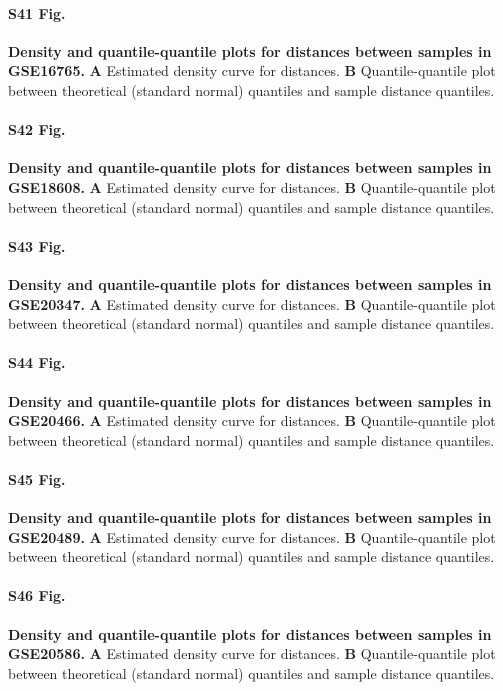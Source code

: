\documentclass[10pt,letterpaper]{article}
\begin{document}
\paragraph*{S41 Fig.}
\hypertarget{S41_Fig}{
{\bf Density and quantile-quantile plots for distances between samples in GSE16765.} \textbf{A} Estimated density curve for distances. \textbf{B} Quantile-quantile plot between theoretical (standard normal) quantiles and sample distance quantiles.}

\paragraph*{S42 Fig.}
\hypertarget{S42_Fig}{
{\bf Density and quantile-quantile plots for distances between samples in GSE18608.} \textbf{A} Estimated density curve for distances. \textbf{B} Quantile-quantile plot between theoretical (standard normal) quantiles and sample distance quantiles.}

\paragraph*{S43 Fig.}
\hypertarget{S43_Fig}{
{\bf Density and quantile-quantile plots for distances between samples in GSE20347.} \textbf{A} Estimated density curve for distances. \textbf{B} Quantile-quantile plot between theoretical (standard normal) quantiles and sample distance quantiles.}

\paragraph*{S44 Fig.}
\hypertarget{S44_Fig}{
{\bf Density and quantile-quantile plots for distances between samples in GSE20466.} \textbf{A} Estimated density curve for distances. \textbf{B} Quantile-quantile plot between theoretical (standard normal) quantiles and sample distance quantiles.}

\paragraph*{S45 Fig.}
\hypertarget{S45_Fig}{
{\bf Density and quantile-quantile plots for distances between samples in GSE20489.} \textbf{A} Estimated density curve for distances. \textbf{B} Quantile-quantile plot between theoretical (standard normal) quantiles and sample distance quantiles.}

\paragraph*{S46 Fig.}
\hypertarget{S46_Fig}{
{\bf Density and quantile-quantile plots for distances between samples in GSE20586.} \textbf{A} Estimated density curve for distances. \textbf{B} Quantile-quantile plot between theoretical (standard normal) quantiles and sample distance quantiles.}
\end{document}
